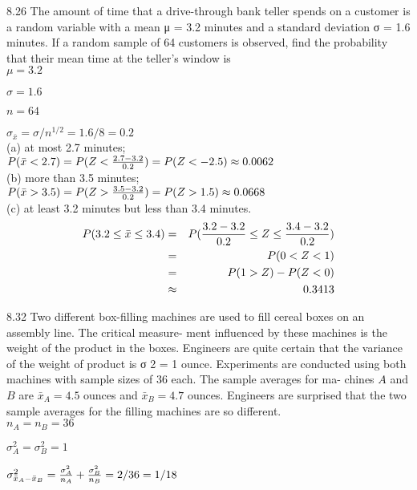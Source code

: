 8.26 The amount of time that a drive-through bank
teller spends on a customer is a random variable with
a mean μ = 3.2 minutes and a standard deviation
σ = 1.6 minutes. If a random sample of 64 customers
is observed, find the probability that their mean time
at the teller’s window is \\

$\mu = 3.2$

$\sigma = 1.6$

$n = 64$

$\sigma_{\bar{x}} = \sigma/n^{1/2} = 1.6/8 = 0.2$ \\

(a) at most 2.7 minutes; \\

$P(\bar{x} < 2.7) = P(Z < \frac{2.7-3.2}{0.2}) = P(Z < -2.5) \approx 0.0062$ \\

(b) more than 3.5 minutes; \\

$P(\bar{x} > 3.5) = P(Z > \frac{3.5 - 3.2}{0.2}) = P(Z > 1.5) \approx 0.0668$ \\

(c) at least 3.2 minutes but less than 3.4 minutes. \\

\begin{eqnarray*}
P(3.2 \leq \bar{x} \leq 3.4) & = & P(\frac{3.2 - 3.2}{0.2} \leq Z \leq \frac{3.4 - 3.2}{0.2})  \\
& = &  P(0 < Z < 1) \\
& = &  P(1 > Z) - P(Z < 0) \\
& \approx & 0.3413
\end{eqnarray*}


8.32 Two different box-filling machines are used to fill
cereal boxes on an assembly line. The critical measure-
ment influenced by these machines is the weight of the
product in the boxes. Engineers are quite certain that
the variance of the weight of product is σ 2 = 1 ounce.
Experiments are conducted using both machines with
sample sizes of 36 each. The sample averages for ma-
chines $A$ and $B$ are $\bar{x}_A = 4.5$ ounces and $\bar{x}_B = 4.7$ ounces. Engineers are surprised that the two sample
averages for the filling machines are so different. \\

$n_A = n_B = 36$

$\sigma^2_A = \sigma^2_B = 1$

$\sigma^2_{\bar{x}_A - \bar{x}_B} = 
\frac{\sigma^2_A}{n_A} 
+ \frac{\sigma^2_B}{n_B}  
= 2/36 = 1/18$ \\

